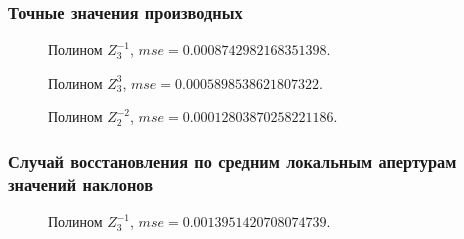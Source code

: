 \documentclass{article}
\begin{document}
\subsubsection{Точные значения производных}
\begin{figure}[H]
\caption{Полином $Z_3^{-1}$, $mse =0.0008742982168351398$.}
\end{figure}
\begin{figure}[H]
\caption{Полином $Z_3^{3}$, $mse =0.0005898538621807322$.}
\end{figure}
\begin{figure}[H]
\caption{Полином $Z_2^{-2}$, $mse =0.00012803870258221186$.}
\end{figure}

\subsubsection{Случай восстановления по средним локальным апертурам значений наклонов}
\begin{figure}[H]
\caption{Полином $Z_3^{-1}$, $mse = 0.0013951420708074739$.}
\end{figure}
\end{document}
